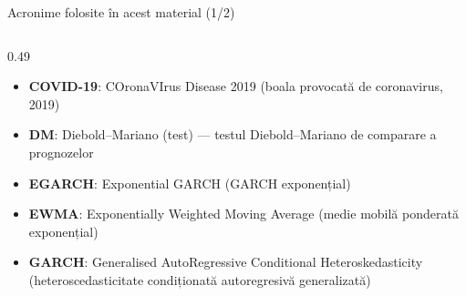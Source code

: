 \begin{frame}{Acronime folosite în acest material (1/2)}
\begin{columns}[T]
\begin{column}{0.49\textwidth}
\begin{itemize}
    \item \textbf{COVID-19}: COronaVIrus Disease 2019 (boala provocată de coronavirus, 2019)
    \item \textbf{DM}: Diebold–Mariano (test) — testul Diebold–Mariano de comparare a prognozelor
    \item \textbf{EGARCH}: Exponential GARCH (GARCH exponențial)
    \item \textbf{EWMA}: Exponentially Weighted Moving Average (medie mobilă ponderată exponențial)
    \item \textbf{GARCH}: Generalised AutoRegressive Conditional Heteroskedasticity (heteroscedasticitate condiționată autoregresivă generalizată)
\end{itemize}
\end{column}
\end{columns}
\end{frame}
